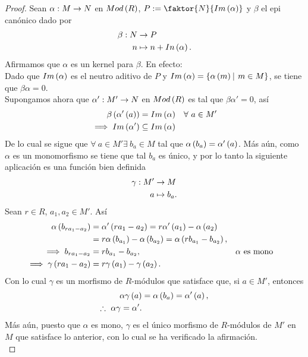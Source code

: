 \documentclass{article}
\begin{document}
\begin{enumerate}[label=\textbf{Ej \arabic*.}]
\begin{proof}
			 Sean $\catarrow{\alpha}{M}{N}{}$ en $Mod\left(R\right)$, $P:=\faktor{N}{Im\lrprth{\alpha}}$ y $\beta$ el epi canónico dado por
			\begin{align*}
				\beta: N &\rightarrow P\\ n &\mapsto n+In\left(\alpha\right).
			\end{align*}
			Afirmamos que $\alpha$ es un kernel para $\beta$. En efecto:\\
			Dado que $Im\left(\alpha\right)$ es el neutro aditivo de $P$ y $Im\lrprth{\alpha}=\lrbrack{\alpha\lrprth{m}\ \vline\ m\in M}$, se tiene que $\beta\alpha=0$.\\
			Supongamos ahora que $\catarrow{\alpha'}{M'}{N}{}$ en $Mod\left(R\right)$ es tal que $\beta\alpha'=0$, así
			\begin{align*}
				\beta\left(\alpha'\left(a\right)\right)&=Im\left(\alpha\right) && \forall\ a\in M'\\
				\implies Im\left(\alpha'\right)&\subseteq Im\left(\alpha\right)
			\end{align*}
			De lo cual se sigue que	$\forall\ a\in M' \exists\ b_a\in M$ tal que $\alpha\left(b_a\right)=\alpha'\left(a\right)$. Más aún, como $\alpha$ es un monomorfismo se tiene que tal $b_a$ es único, y por lo tanto la siguiente aplicación es una función bien definida
			\begin{align*}
				\gamma: M' &\rightarrow M\\ a &\mapsto b_a.
			\end{align*}
			Sean $r\in R$, $a_1,a_2\in M'$. Así
			\begin{align*}
				\alpha\left(b_{ra_1-a_2}\right)&=\alpha'\left(ra_1-a_2\right)=r\alpha'\left(a_1\right)-\alpha\left(a_2\right)\\
				&=r\alpha\left(b_{a_1}\right)-\alpha\left(b_{a_2}\right)=\alpha\left(rb_{a_1}-b_{a_2}\right),\\
				\implies b_{ra_1-a_2}&=rb_{a_1}-b_{a_2}, && \alpha\text{ es mono}\\
				\implies \gamma\left(ra_1-a_2\right)&=r\gamma\left(a_1\right)-\gamma\left(a_2\right).
			\end{align*}
			Con lo cual $\gamma$ es un morfismo de $R$-módulos que satisface que, si $a\in M'$, entonces
			\begin{align*}
				\alpha\gamma\left(a\right)&=\alpha\left(b_a\right)=\alpha'\left(a\right),\\
				\therefore\ \alpha\gamma=\alpha'.
			\end{align*}
			Más aún, puesto que $\alpha$ es mono, $\gamma$ es el único morfismo de $R$-módulos de $M'$ en $M$ que satisface lo anterior, con lo cual se ha verificado la afirmación.\\
			

\end{proof}
\end{enumerate}
\end{document}

